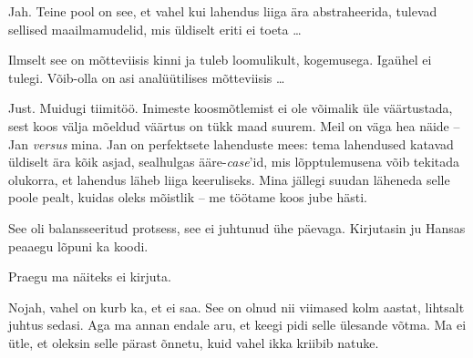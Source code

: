 Jah. Teine pool on see, et vahel kui lahendus liiga ära abstraheerida, tulevad sellised 
maailmamudelid, mis üldiselt eriti ei toeta \ldots 


Ilmselt see on 
mõtteviisis kinni ja tuleb loomulikult, kogemusega. Igaühel ei tulegi. 
Võib-olla on asi analüütilises mõtteviisis \ldots 


Just. Muidugi tiimitöö. Inimeste koosmõtlemist ei ole võimalik üle väärtustada, sest koos välja mõeldud väärtus on tükk maad 
suurem. Meil on väga hea näide -- Jan \emph{versus} mina. Jan on 
perfektsete lahenduste mees: tema lahendused katavad üldiselt ära kõik asjad, sealhulgas
ääre-\emph{case}'id, mis lõpptulemusena võib tekitada olukorra, et lahendus 
läheb liiga keeruliseks. Mina jällegi suudan läheneda selle poole pealt, kuidas 
oleks mõistlik -- me töötame koos jube hästi. 


See oli balansseeritud protsess, see ei juhtunud ühe päevaga. 
Kirjutasin ju Hansas peaaegu lõpuni ka koodi. 


Praegu ma näiteks ei kirjuta.


Nojah, vahel on kurb ka, et ei saa. See on 
olnud nii viimased kolm aastat, lihtsalt juhtus sedasi. Aga ma annan endale aru, et keegi pidi 
selle ülesande võtma. Ma ei ütle, et oleksin selle pärast õnnetu, 
kuid vahel ikka kriibib natuke.

